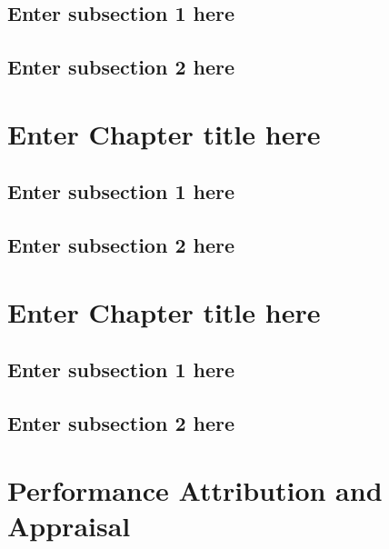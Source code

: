 \documentclass[
]{book}
\begin{document}
\hypertarget{enter-subsection-1-here-1}{%
\section{Enter subsection 1 here}\label{enter-subsection-1-here-1}}

\hypertarget{enter-subsection-2-here-1}{%
\section{Enter subsection 2 here}\label{enter-subsection-2-here-1}}

\hypertarget{ch6}{%
\chapter{Enter Chapter title here}\label{ch6}}

\hypertarget{enter-subsection-1-here-2}{%
\section{Enter subsection 1 here}\label{enter-subsection-1-here-2}}

\hypertarget{enter-subsection-2-here-2}{%
\section{Enter subsection 2 here}\label{enter-subsection-2-here-2}}

\hypertarget{ch7}{%
\chapter{Enter Chapter title here}\label{ch7}}

\hypertarget{enter-subsection-1-here-3}{%
\section{Enter subsection 1 here}\label{enter-subsection-1-here-3}}

\hypertarget{enter-subsection-2-here-3}{%
\section{Enter subsection 2 here}\label{enter-subsection-2-here-3}}

\hypertarget{ch8}{%
\chapter{Performance Attribution and Appraisal}\label{ch8}}
\end{document}
